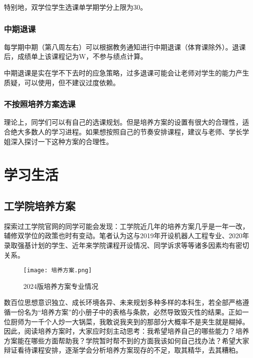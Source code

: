 \documentclass[11pt,oneside]{book}
\begin{document}
特别地，双学位学生选课单学期学分上限为30。

\subsection{中期退课}
每学期中期（第八周左右）可以根据教务通知进行中期退课（体育课除外）。退课后，成绩单上该课程记为W，不参与绩点计算。

中期退课是实在学不下去时的应急策略，过多退课可能会让老师对学生的能力产生质疑，可以使用，但不建议过度依赖。

\subsection{不按照培养方案选课}
理论上，同学们可以有自己的选课规划。但是培养方案的设置有很大的合理性，适合绝大多数人的学习进程。如果想按照自己的节奏安排课程，建议与老师、学长学姐深入探讨一下这种方案的合理性。

\chapter{学习生活}
\section{工学院培养方案}
探索过工学院官网的同学可能会发现：工学院近几年的培养方案几乎是一年一改，辅修双学位的政策也时有变动。笔者认为这与2019年开设机器人工程专业、2020年录取强基计划的学生、近年来学院课程开设情况、同学诉求等等诸多因素均有密切关系。



\begin{figure}[htbp]
    \centering
    \texttt{[image: 培养方案.png]}
    \renewcommand{\figurename}{图}
    \caption{2024版培养方案专业情况}
    \label{fig:enter-label}
\end{figure}


\vspace{10pt}

数百位思想意识独立、成长环境各异、未来规划多种多样的本科生，若全部严格遵循一份名为“培养方案”的小册子中的表格与条款，必然导致毁灭性的结果。正如一位厨师为一千个人炒一大锅菜，我敢说我夹到的那部分大概率不是夹生就是糊掉。因此，阅读培养方案时，大家应时刻主动思考：我希望培养自己的哪些能力？培养方案能在哪些方面帮助我？学院暂时帮不到的方面我该如何自己找办法？希望大家辩证看待课程安排，逐渐学会分析培养方案现存的不足，取其精华，去其糟粕。

\vspace{10pt}
\end{document}
